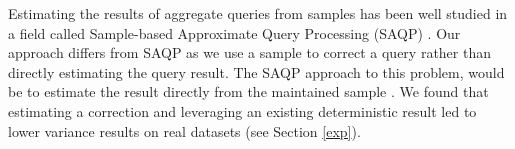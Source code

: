 Estimating the results of aggregate queries from samples has been
well studied in a field called Sample-based Approximate Query Processing
(SAQP) \cite{OlkenR86,AgarwalMPMMS13}.
Our approach differs from SAQP as we use a sample to correct a query rather than directly estimating the query result.
The SAQP approach to this problem, would be to
estimate the result directly from the maintained sample \cite{joshi2008materialized}.
We found that estimating
a correction and leveraging an existing deterministic result led
to lower variance results on real datasets (see Section \ref{exp}). 



